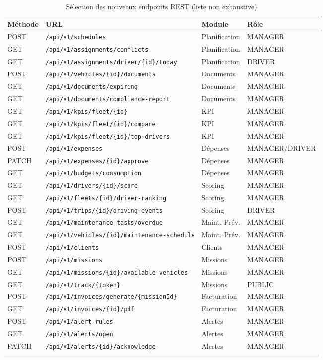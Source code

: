 \documentclass[12pt,a4paper]{report}
\begin{document}
\begin{longtable}{p{1.5cm}p{7cm}p{2.5cm}p{2cm}}
\toprule
\textbf{Méthode} & \textbf{URL} & \textbf{Module} & \textbf{Rôle} \\
\midrule
\endhead
POST & \texttt{/api/v1/schedules} & Planification & MANAGER \\
GET & \texttt{/api/v1/assignments/conflicts} & Planification & MANAGER \\
GET & \texttt{/api/v1/assignments/driver/\{id\}/today} & Planification & DRIVER \\
POST & \texttt{/api/v1/vehicles/\{id\}/documents} & Documents & MANAGER \\
GET & \texttt{/api/v1/documents/expiring} & Documents & MANAGER \\
GET & \texttt{/api/v1/documents/compliance-report} & Documents & MANAGER \\
GET & \texttt{/api/v1/kpis/fleet/\{id\}} & KPI & MANAGER \\
GET & \texttt{/api/v1/kpis/fleet/\{id\}/compare} & KPI & MANAGER \\
GET & \texttt{/api/v1/kpis/fleet/\{id\}/top-drivers} & KPI & MANAGER \\
POST & \texttt{/api/v1/expenses} & Dépenses & MANAGER/DRIVER \\
PATCH & \texttt{/api/v1/expenses/\{id\}/approve} & Dépenses & MANAGER \\
GET & \texttt{/api/v1/budgets/consumption} & Dépenses & MANAGER \\
GET & \texttt{/api/v1/drivers/\{id\}/score} & Scoring & MANAGER \\
GET & \texttt{/api/v1/fleets/\{id\}/driver-ranking} & Scoring & MANAGER \\
POST & \texttt{/api/v1/trips/\{id\}/driving-events} & Scoring & DRIVER \\
GET & \texttt{/api/v1/maintenance-tasks/overdue} & Maint. Prév. & MANAGER \\
GET & \texttt{/api/v1/vehicles/\{id\}/maintenance-schedule} & Maint. Prév. & MANAGER \\
POST & \texttt{/api/v1/clients} & Clients & MANAGER \\
POST & \texttt{/api/v1/missions} & Missions & MANAGER \\
GET & \texttt{/api/v1/missions/\{id\}/available-vehicles} & Missions & MANAGER \\
GET & \texttt{/api/v1/track/\{token\}} & Missions & PUBLIC \\
POST & \texttt{/api/v1/invoices/generate/\{missionId\}} & Facturation & MANAGER \\
GET & \texttt{/api/v1/invoices/\{id\}/pdf} & Facturation & MANAGER \\
POST & \texttt{/api/v1/alert-rules} & Alertes & MANAGER \\
GET & \texttt{/api/v1/alerts/open} & Alertes & MANAGER \\
PATCH & \texttt{/api/v1/alerts/\{id\}/acknowledge} & Alertes & MANAGER \\
\bottomrule
\caption{Sélection des nouveaux endpoints REST (liste non exhaustive)}
\end{longtable}
\end{document}
